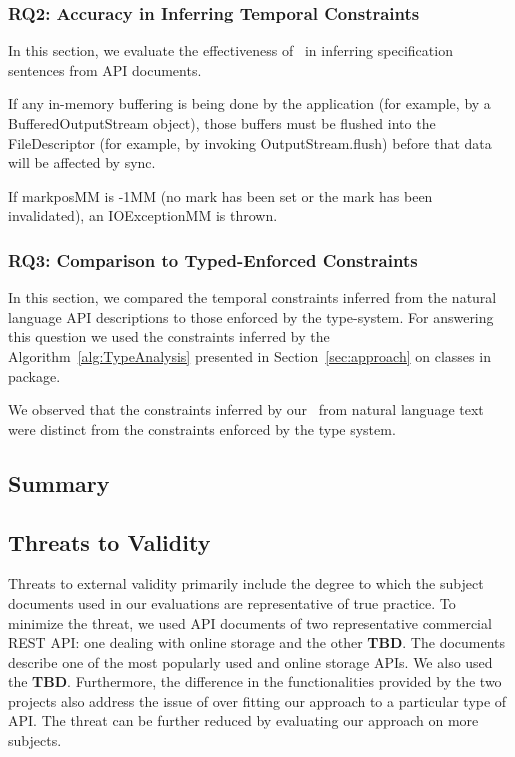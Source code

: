 \subsubsection{RQ2: Accuracy in Inferring Temporal Constraints}

In this section, we evaluate the effectiveness of \tool\ in inferring specification sentences from API documents.

If any in-memory buffering is being done by the application (for example, by a BufferedOutputStream object), those buffers must be flushed into the FileDescriptor (for example, by invoking OutputStream.flush) before that data will be affected by sync.


If markposMM is -1MM (no mark has been set or the mark has been invalidated), an IOExceptionMM is thrown.

\subsubsection{RQ3: Comparison to Typed-Enforced Constraints}

In this section, we compared the temporal constraints inferred from the natural language API descriptions to those enforced by the type-system. For answering this question we used the constraints inferred by the Algorithm~\ref{alg:TypeAnalysis} presented in Section~\ref{sec:approach} on classes in  package.

We observed that the constraints inferred by our \tool\ from natural language text were distinct from the constraints enforced by the type system. 



\subsection{Summary}
\label{sub:summary}



\subsection{Threats to Validity}
\label{sub:threats_to_validity}
Threats to external validity primarily include the degree to which the subject documents used in our evaluations are representative of true practice. To minimize the threat, we used API documents of two representative commercial REST API: one dealing with online storage and the other \textbf{TBD}. The \amazon documents describe one of the most popularly used and online storage APIs. We also used the \textbf{TBD}. Furthermore, the difference in the functionalities provided by the two projects also address the issue of over fitting our approach to a particular type of API. The threat can be further reduced by evaluating our approach on more subjects. 

